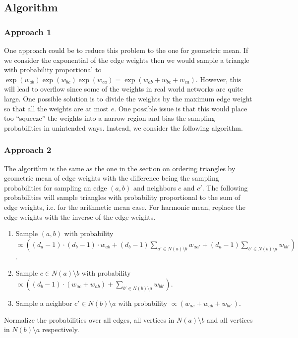 \documentclass{article}
\begin{document}

\subsection{Algorithm}

\subsubsection{Approach 1}

One approach could be to reduce this problem to the one for 
geometric mean. If we consider the exponential of the edge weights
then we would sample a triangle with probability proportional to
$\exp(w_{ab}) \exp(w_{bc}) \exp(w_{ca}) = \exp(w_{ab} + w_{bc} +
w_{ca})$. However, this will lead to overflow since some of the
weights in real world networks are quite large. One possible
solution is to divide the weights by the maximum edge weight so
that all the weights are at most $e$. One possible issue is that
this would place too ``squeeze'' the weights into a narrow
region and bias the sampling probabilities in unintended ways.
Instead, we consider the following algorithm.

\subsubsection{Approach 2}

The algorithm is the same as the one in the section
on ordering triangles by geometric mean of edge weights
with the difference being the sampling probabilities
for sampling an edge $(a,b)$ and neighbors $c$ and $c'$.
The following probabilities will sample triangles with
probability proportional to the sum of edge weights, i.e.
for the arithmetic mean case. For harmonic mean, replace the
edge weights with the inverse of the edge weights.
\begin{enumerate}
\item Sample $(a,b)$ with probability $\propto \left((d_a-1)\cdot 
(d_b-1) \cdot w_{ab} + (d_b-1) \sum\limits_{a'\in N(a) \setminus b} 
w_{aa'} + (d_a-1) \sum\limits_{b' \in N(b)\setminus a} w_{bb'}\right)$. 
\item Sample $c \in N(a) \setminus b$ with probability 
$\propto \left((d_b-1) \cdot (w_{ac} + w_{ab}) + \sum\limits_{b' \in N(b)\setminus a}
w_{bb'}\right)$. 
\item Sample a neighbor $c' \in N(b) \setminus a$ with probability 
$\propto \left(w_{ac} + w_{ab} + w_{bc'}\right)$.  
\end{enumerate}
Normalize the probabilities over all edges, all vertices in
$N(a) \setminus b$ and all vertices in $N(b) \setminus a$
respectively.
\end{document}
